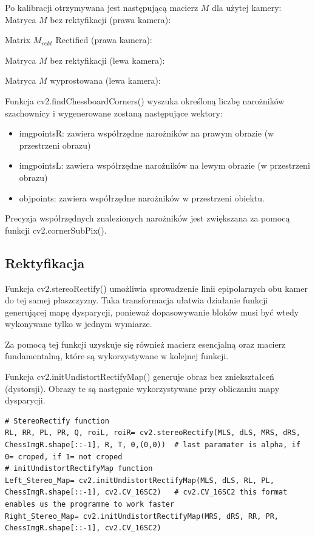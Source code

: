 \documentclass[magisterska]{pracadypl}
\begin{document}
Po kalibracji otrzymywana jest następującą macierz $M$ dla użytej kamery:\\

Matryca $M$ bez rektyfikacji (prawa kamera):

Matrix $M_{rekt}$ Rectified (prawa kamera):

Matryca $M$ bez rektyfikacji (lewa kamera):

Matryca $M$ wyprostowana (lewa kamera):

Funkcja cv2.findChessboardCorners() wyszuka określoną liczbę narożników szachownicy
i wygenerowane zostaną następujące wektory:

\begin{itemize}
  \item imgpointsR: zawiera współrzędne narożników na prawym obrazie (w przestrzeni obrazu)
  \item imgpointsL: zawiera współrzędne narożników na lewym obrazie (w przestrzeni obrazu)
  \item objpoints: zawiera współrzędne narożników w przestrzeni obiektu.
\end{itemize}

Precyzja współrzędnych znalezionych narożników jest zwiększana za pomocą funkcji
cv2.cornerSubPix().

\subsection{Rektyfikacja}

Funkcja cv2.stereoRectify() umożliwia sprowadzenie linii epipolarnych obu kamer do tej samej płaszczyzny. Taka transformacja ułatwia działanie funkcji generującej mapę dysparycji, ponieważ dopasowywanie bloków musi być wtedy wykonywane tylko w jednym wymiarze.

Za pomocą tej funkcji uzyskuje się również macierz esencjalną oraz macierz fundamentalną, które są wykorzystywane w kolejnej funkcji.

Funkcja cv2.initUndistortRectifyMap() generuje obraz bez zniekształceń (dystorsji). Obrazy te są następnie wykorzystywane przy obliczaniu mapy dysparycji.

\begin{lstlisting}[style=mypython]
# StereoRectify function
RL, RR, PL, PR, Q, roiL, roiR= cv2.stereoRectify(MLS, dLS, MRS, dRS, ChessImgR.shape[::-1], R, T, 0,(0,0))  # last paramater is alpha, if 0= croped, if 1= not croped
# initUndistortRectifyMap function
Left_Stereo_Map= cv2.initUndistortRectifyMap(MLS, dLS, RL, PL, ChessImgR.shape[::-1], cv2.CV_16SC2)   # cv2.CV_16SC2 this format enables us the programme to work faster
Right_Stereo_Map= cv2.initUndistortRectifyMap(MRS, dRS, RR, PR, ChessImgR.shape[::-1], cv2.CV_16SC2)
\end{lstlisting}
\end{document}
